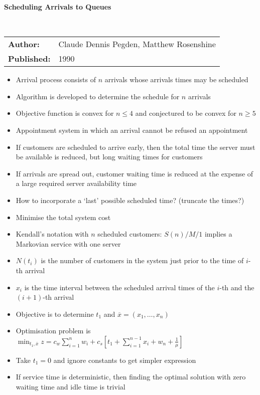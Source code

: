 \documentclass{article}
\begin{document}
\textbf{Scheduling Arrivals to Queues}

\ \newline

\begin{tabular}{l l}
    \textbf{Author:} & Claude Dennis Pegden, Matthew Rosenshine \\
    \textbf{Published:} & 1990 \\
\end{tabular}

\begin{itemize}
	\item Arrival process consists of $n$ arrivals whose arrivals times may be scheduled
    \item Algorithm is developed to determine the schedule for $n$ arrivals
    \item Objective function is convex for $n \leq 4$ and conjectured to be convex for $n \geq 5$
    \item Appointment system in which an arrival cannot be refused an appointment
    \item If customers are scheduled to arrive early, then the total time the server must be available is reduced, but long waiting times for customers
    \item If arrivals are spread out, customer waiting time is reduced at the expense of a large required server availability time
    \item How to incorporate a `last' possible scheduled time? (truncate the times?)
    \item Minimise the total system cost
    \item Kendall's notation with $n$ scheduled customers: $S (n) / M / 1$ implies a Markovian service with one server
    \item $N (t_{i})$ is the number of customers in the system just prior to the time of $i$-th arrival
    \item $x_{i}$ is the time interval between the scheduled arrival times of the $i$-th and the $(i + 1)$-th arrival
    \item Objective is to determine $t_{1}$ and $\overline{x} = (x_{1}, \ldots, x_{n})$
    \item Optimisation problem is $\min_{t_{1}, \overline{x}} z = c_{w} \sum_{i = 1}^{n} w_{i} + c_{s} \left[ t_{1} + \sum_{i = 1}^{n - 1} x_{i} + w_{n} + \frac{1}{\mu} \right]$
    \item Take $t_{1} = 0$ and ignore constants to get simpler expression
    \item If service time is deterministic, then finding the optimal solution with zero waiting time and idle time is trivial

\end{itemize}
\end{document}
